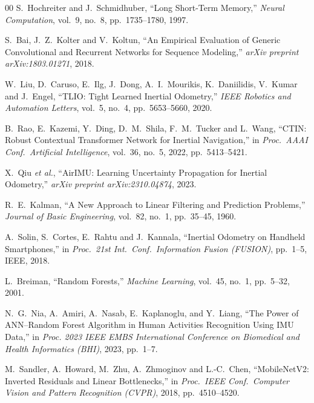 \documentclass[10pt,conference,letterpaper]{IEEEtran}
\begin{document}
\begin{thebibliography}{00}
S.\ Hochreiter and J.\ Schmidhuber,
``Long Short-Term Memory,''
\textit{Neural Computation}, vol.\ 9, no.\ 8,
pp.\ 1735--1780, 1997.

S.\ Bai, J.\ Z.\ Kolter and V.\ Koltun,
``An Empirical Evaluation of Generic Convolutional and Recurrent
Networks for Sequence Modeling,''
\textit{arXiv preprint arXiv:1803.01271}, 2018.

W.~Liu, D.~Caruso, E.~Ilg, J.~Dong, A.~I.~Mourikis, K.~Daniilidis,
V.~Kumar and J.~Engel,
``TLIO: Tight Learned Inertial Odometry,''
\textit{IEEE Robotics and Automation Letters}, vol.~5, no.~4,
pp.~5653--5660, 2020.

B.~Rao, E.~Kazemi, Y.~Ding, D.~M.~Shila, F.~M.~Tucker and L.~Wang,
``CTIN: Robust Contextual Transformer Network for Inertial
Navigation,''
in \textit{Proc.\ AAAI Conf.\ Artificial Intelligence}, vol.~36,
no.~5, 2022, pp.~5413--5421.

X.\ Qiu \textit{et al.},
``AirIMU: Learning Uncertainty Propagation for Inertial Odometry,''
\textit{arXiv preprint arXiv:2310.04874}, 2023.

R.\ E.\ Kalman,
``A New Approach to Linear Filtering and Prediction Problems,''
\textit{Journal of Basic Engineering}, vol.\ 82, no.\ 1,
pp.\ 35--45, 1960.

A.\ Solin, S.\ Cortes, E.\ Rahtu and J.\ Kannala,
``Inertial Odometry on Handheld Smartphones,''
in \textit{Proc.\ 21st Int.\ Conf.\ Information Fusion (FUSION)},
pp.\ 1--5, IEEE, 2018.

L.\ Breiman,
``Random Forests,''
\textit{Machine Learning}, vol.\ 45, no.\ 1,
pp.\ 5--32, 2001.


N.~G.~Nia, A.~Amiri, A.~Nasab, E.~Kaplanoglu, and Y.~Liang,
``The Power of ANN--Random Forest Algorithm in Human Activities Recognition
Using IMU Data,''
in \textit{Proc. 2023 IEEE EMBS International Conference on Biomedical and
Health Informatics (BHI)}, 2023, pp.~1--7.

M.\ Sandler, A.\ Howard, M.\ Zhu, A.\ Zhmoginov and L.-C.\ Chen,
``MobileNetV2: Inverted Residuals and Linear Bottlenecks,''
in \textit{Proc.\ IEEE Conf.\ Computer Vision and Pattern
Recognition (CVPR)}, 2018, pp.~4510--4520.


\end{thebibliography}
\end{document}
